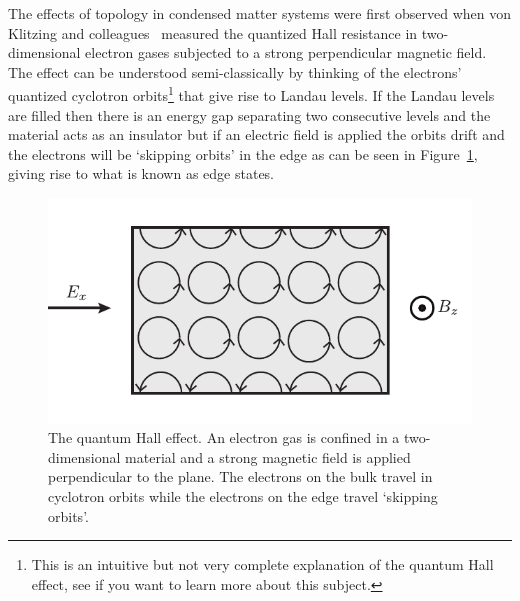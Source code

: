 The effects of topology in condensed matter systems were first observed when von Klitzing and colleagues~\cite{klitzing_new_1980} measured the quantized Hall resistance in two-dimensional electron gases subjected to a strong perpendicular magnetic field. The effect can be understood semi-classically by thinking of the electrons' quantized cyclotron orbits\footnote{This is an intuitive but not very complete explanation of the quantum Hall effect, see \cite{tong_lectures_2016} if you want to learn more about this subject.} that give rise to Landau levels. If the Landau levels are filled then there is an energy gap separating two consecutive levels and the material acts as an insulator but if an electric field is applied the orbits drift and the electrons will be `skipping orbits' in the edge as can be seen in Figure~\ref{fig:quantum_hall}, giving rise to what is known as edge states.
% 
\begin{figure}[htb]
\begin{center}
\includegraphics[]{Figures/Chapter7/quantum_hall.pdf}
\caption[The quantum Hall effect]{The quantum Hall effect. An electron gas is confined in a two-dimensional material and a strong magnetic field is applied perpendicular to the plane. The electrons on the bulk travel in cyclotron orbits while the electrons on the edge travel `skipping orbits'.}
\label{fig:quantum_hall}
\end{center}
\end{figure}

